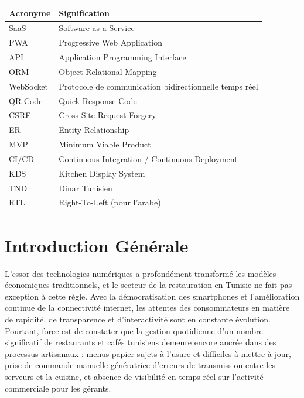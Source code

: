 \documentclass[12pt,a4paper]{report}
\begin{document}
\begin{tabularx}{\textwidth}{l X}
    \toprule
    \textbf{Acronyme} & \textbf{Signification} \\
    \midrule
    SaaS & Software as a Service \\
    PWA & Progressive Web Application \\
    API & Application Programming Interface \\
    ORM & Object-Relational Mapping \\
    WebSocket & Protocole de communication bidirectionnelle temps r\'eel \\
    QR Code & Quick Response Code \\
    CSRF & Cross-Site Request Forgery \\
    ER & Entity-Relationship \\
    MVP & Minimum Viable Product \\
    CI/CD & Continuous Integration / Continuous Deployment \\
    KDS & Kitchen Display System \\
    TND & Dinar Tunisien \\
    RTL & Right-To-Left (pour l'arabe) \\
    \bottomrule
\end{tabularx}

\cleardoublepage
\chapter*{Introduction G\'en\'erale}

L'essor des technologies numériques a profondément transformé les modèles économiques traditionnels, et le secteur de la restauration en Tunisie ne fait pas exception à cette règle. Avec la démocratisation des smartphones et l'amélioration continue de la connectivité internet, les attentes des consommateurs en matière de rapidité, de transparence et d'interactivité sont en constante évolution. Pourtant, force est de constater que la gestion quotidienne d'un nombre significatif de restaurants et cafés tunisiens demeure encore ancrée dans des processus artisanaux : menus papier sujets à l'usure et difficiles à mettre à jour, prise de commande manuelle génératrice d'erreurs de transmission entre les serveurs et la cuisine, et absence de visibilité en temps réel sur l'activité commerciale pour les gérants.
\end{document}
